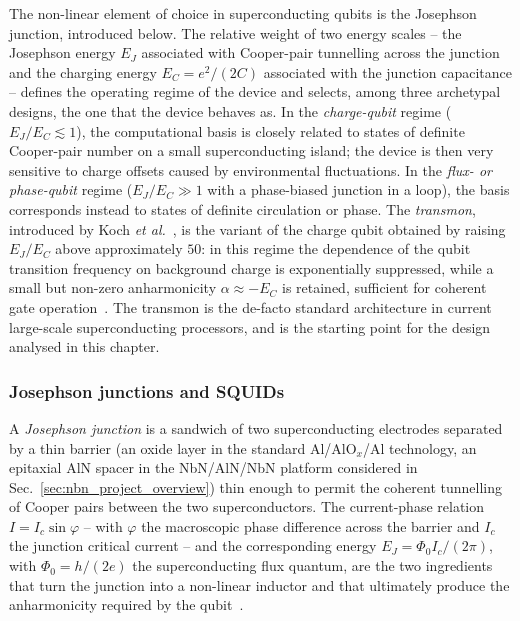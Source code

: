 The non-linear element of choice in superconducting qubits is the Josephson junction, introduced below. The relative weight of two energy scales -- the Josephson energy $E_J$ associated with Cooper-pair tunnelling across the junction and the charging energy $E_C = e^2/(2C)$ associated with the junction capacitance -- defines the operating regime of the device and selects, among three archetypal designs, the one that the device behaves as. In the \emph{charge-qubit} regime ($E_J/E_C \lesssim 1$), the computational basis is closely related to states of definite Cooper-pair number on a small superconducting island; the device is then very sensitive to charge offsets caused by environmental fluctuations. In the \emph{flux- or phase-qubit} regime ($E_J/E_C \gg 1$ with a phase-biased junction in a loop), the basis corresponds instead to states of definite circulation or phase. The \emph{transmon}, introduced by Koch \emph{et al.}~\cite{Koch2007Transmon}, is the variant of the charge qubit obtained by raising $E_J/E_C$ above approximately $50$: in this regime the dependence of the qubit transition frequency on background charge is exponentially suppressed, while a small but non-zero anharmonicity $\alpha \approx -E_C$ is retained, sufficient for coherent gate operation~\cite{kjaergaard2020,krantz2019}. The transmon is the de-facto standard architecture in current large-scale superconducting processors, and is the starting point for the design analysed in this chapter.

\subsubsection*{Josephson junctions and SQUIDs}

A \emph{Josephson junction} is a sandwich of two superconducting electrodes separated by a thin barrier (an oxide layer in the standard Al/AlO$_x$/Al technology, an epitaxial AlN spacer in the NbN/AlN/NbN platform considered in Sec.~\ref{sec:nbn_project_overview}) thin enough to permit the coherent tunnelling of Cooper pairs between the two superconductors. The current-phase relation $I = I_c \sin\varphi$ -- with $\varphi$ the macroscopic phase difference across the barrier and $I_c$ the junction critical current -- and the corresponding energy $E_J = \Phi_0 I_c / (2\pi)$, with $\Phi_0 = h/(2e)$ the superconducting flux quantum, are the two ingredients that turn the junction into a non-linear inductor and that ultimately produce the anharmonicity required by the qubit~\cite{devoret2013}.

